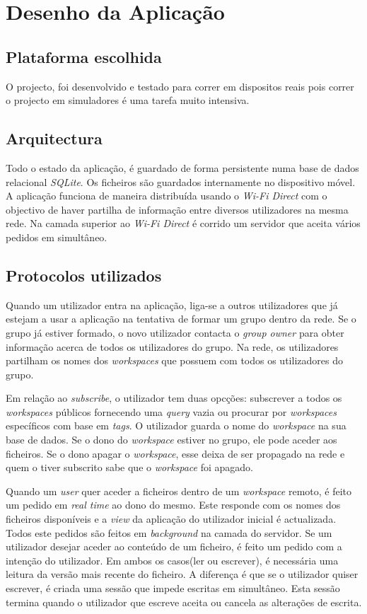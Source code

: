 \section{Desenho da Aplicação}

\subsection{Plataforma escolhida}
O projecto, foi desenvolvido e testado para correr em dispositos reais pois correr o projecto em simuladores é uma tarefa muito intensiva.
\subsection{Arquitectura}
Todo o estado da aplicação, é guardado de forma persistente numa base de dados relacional \textit{SQLite}. Os ficheiros são guardados internamente no dispositivo móvel. A aplicação funciona de maneira distribuída usando o \textit{Wi-Fi Direct} com o objectivo de haver partilha de informação entre diversos utilizadores na mesma rede. Na camada superior ao \textit{Wi-Fi Direct} é corrido um servidor que aceita vários pedidos em simultâneo.
\subsection{Protocolos utilizados}
Quando um utilizador entra na aplicação, liga-se a outros utilizadores que já estejam a usar a aplicação na tentativa de formar um grupo dentro da rede. Se o grupo já estiver formado, o novo utilizador contacta o \textit{group owner} para obter informação acerca de todos os utilizadores do grupo. Na rede, os utilizadores partilham os nomes dos \textit{workspaces} que possuem com todos os utilizadores do grupo.

Em relação ao \textit{subscribe}, o utilizador tem duas opcções: subscrever a todos os \textit{workspaces} públicos fornecendo uma \textit{query} vazia ou procurar por \textit{workspaces} específicos com base em \textit{tags}. O utilizador guarda o nome do \textit{workspace} na sua base de dados. Se o dono do \textit{workspace} estiver no grupo, ele pode aceder aos ficheiros. Se o dono apagar o \textit{workspace}, esse deixa de ser propagado na rede e quem o tiver subscrito sabe que o \textit{workspace} foi apagado.

Quando um \textit{user} quer aceder a ficheiros dentro de um \textit{workspace} remoto, é feito um pedido em \textit{real time} ao dono do mesmo. Este responde com os nomes dos ficheiros disponíveis e a \textit{view} da aplicação do utilizador inicial é actualizada. Todos este pedidos são feitos em \textit{background} na camada do servidor. Se um utilizador desejar aceder ao conteúdo de um ficheiro, é feito um pedido com a intenção do utilizador. Em ambos os casos(ler ou escrever), é necessária uma leitura da versão mais recente do ficheiro. A diferença é que se o utilizador quiser escrever, é criada uma sessão que impede escritas em simultâneo. Esta sessão termina quando o utilizador que escreve aceita ou cancela as alterações de escrita.

